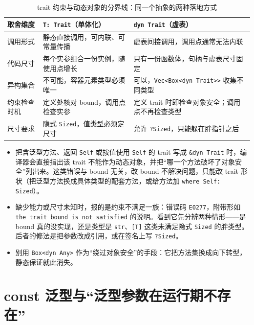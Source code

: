 \documentclass[12pt,a4paper,fontset=fandol]{ctexbook}
\newcommand{\kw}[1]{\texttt{#1}}
\begin{document}
\begin{table}[htbp]
\centering
\begin{tabularx}{0.82\textwidth}{>{\raggedright\arraybackslash}p{} >{\raggedright\arraybackslash}X >{\raggedright\arraybackslash}X}
\toprule
\textbf{取舍维度} & \textbf{\kw{T: Trait}（单体化）} & \textbf{\kw{dyn Trait}（虚表）} \\
\midrule
调用形式 & 静态直接调用，可内联、可常量传播 & 虚表间接调用，调用点通常无法内联 \\
代码尺寸 & 每个实参组合一份实例，随使用点增长 & 只有一份函数体，句柄与虚表尺寸固定 \\
异构集合 & 不可能，容器元素类型必须唯一 & 可以，\kw{Vec<Box<dyn Trait>>} 收集不同类型 \\
约束检查时机 & 定义处核对 bound，调用点检查实参 & 定义 trait 时即检查对象安全；调用点不再检查类型 \\
尺寸要求 & 隐式 \kw{Sized}，值类型必须定尺寸 & 允许 \kw{?Sized}，只能躲在胖指针之后 \\
\bottomrule
\end{tabularx}
\caption{trait 约束与动态对象的分界线：同一个抽象的两种落地方式}
\end{table}

\begin{warning}[title={对象安全失败与 \kw{Sized} 缺失的两类报错}]
  \begin{itemize}
    \item 把含泛型方法、返回 \kw{Self} 或按值使用 \kw{Self} 的 trait 写成 \kw{\&dyn Trait} 时，编译器会直接指出该 trait 不能作为动态对象，并把“哪一个方法破坏了对象安全”列出来。这类错误与 bound 无关，改 bound 不解决问题，只能改 trait 形状（把泛型方法换成具体类型的配套方法，或给方法加 \kw{where Self: Sized}）。
    \item 缺少能力或尺寸未知时，报的是约束不满足一族：错误码 \kw{E0277}，附带形如 \kw{the trait bound is not satisfied} 的说明。看到它先分辨两种情形——是 bound 真的没实现，还是类型是 \kw{str}、\kw{[T]} 这类未满足隐式 \kw{Sized} 的胖类型。后者的修法是把参数改成引用，或在签名上写 \kw{?Sized}。
    \item 别用 \kw{Box<dyn Any>} 作为“绕过对象安全”的手段：它把方法集换成向下转型，静态保证就此消失。
  \end{itemize}
\end{warning}

\section{const 泛型与“泛型参数在运行期不存在”}
\end{document}
